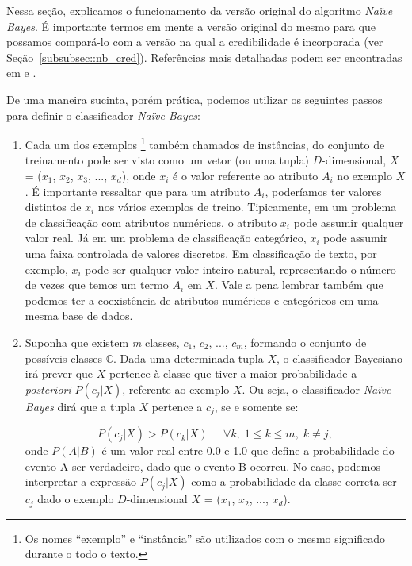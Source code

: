 Nessa seção, explicamos o funcionamento da versão original do algoritmo \textit{Naïve Bayes}. É importante termos em mente a versão original do mesmo para que possamos compará-lo com a versão na qual a credibilidade é incorporada (ver Seção~\ref{subsubsec::nb_cred}). Referências mais detalhadas podem ser encontradas em \cite{DHS01} e \cite{Manning08}.

De uma maneira sucinta, porém prática, podemos utilizar os seguintes passos para definir o classificador \textit{Naïve Bayes}:

\begin{enumerate}
    \item Cada um dos exemplos \footnote{Os nomes ``exemplo'' e ``instância'' são utilizados com o mesmo significado durante o todo o texto.} também chamados de instâncias, do conjunto de treinamento pode ser visto como um vetor (ou uma tupla) $D$-dimensional, $X$ = ($x_1$, $x_2$, $x_3$, ..., $x_d$), onde $x_i$ é o valor referente ao atributo $A_i$ no exemplo $X$. É importante ressaltar que para um atributo $A_i$, poderíamos ter valores distintos de $x_i$ nos vários exemplos de treino. Tipicamente, em um problema de classificação com atributos numéricos, o atributo $x_i$ pode assumir qualquer valor real. Já em um problema de classificação categórico, $x_i$ pode assumir uma faixa controlada de valores discretos. Em classificação de texto, por exemplo, $x_i$ pode ser qualquer valor inteiro natural, representando o número de vezes que temos um termo $A_i$ em $X$. Vale a pena lembrar também que podemos ter a coexistência de atributos numéricos e categóricos em uma mesma base de dados.
    

    \item Suponha que existem \textit{m} classes, $c_1$, $c_2$, ..., $c_\textit{m}$, formando o conjunto de possíveis classes $\mathbb{C}$. Dada uma determinada tupla $X$, o classificador Bayesiano irá prever que $X$ pertence à classe que tiver a maior probabilidade a \textit{posteriori} $P(c_j|X)$, referente ao exemplo $X$. Ou seja, o classificador \textit{Naïve Bayes} dirá que a tupla $X$ pertence a $c_j$, se e somente se:
        
\begin{equation}\label{eqn::max_pcgivenx}
   P(c_{j}|X) > P(c_{k}|X) \;\;\;\;\;\forall k,\; 1 \le k \le m, \; k \not= j,
\end{equation}
onde $P(A|B)$ é um valor real entre 0.0 e 1.0 que define a probabilidade do evento A ser verdadeiro, dado que o evento B ocorreu. No caso, podemos interpretar a expressão $P(c_j|X)$ como a probabilidade da classe correta ser $c_j$ dado o exemplo $D$-dimensional $X$ = ($x_1$, $x_2$, ..., $x_d$).


\end{enumerate}
